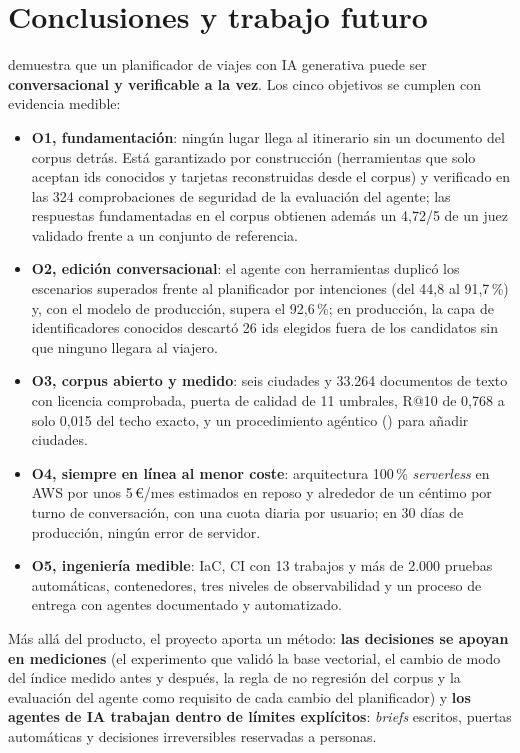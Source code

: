 \section{Conclusiones y trabajo futuro}\label{sec:conclusiones}

\kyrian{} demuestra que un planificador de viajes con IA generativa puede ser
\textbf{conversacional y verificable a la vez}. Los cinco objetivos se cumplen con evidencia
medible:

\begin{itemize}
  \item \textbf{O1, fundamentación}: ningún lugar llega al itinerario sin un documento del corpus
        detrás. Está garantizado por construcción (herramientas que solo aceptan ids conocidos y
        tarjetas reconstruidas desde el corpus) y verificado en las 324 comprobaciones de seguridad
        de la evaluación del agente; las respuestas fundamentadas en el corpus obtienen además un 4,72/5 de un juez validado frente a un conjunto de referencia.
  \item \textbf{O2, edición conversacional}: el agente con herramientas duplicó los escenarios
        superados frente al planificador por intenciones (del 44,8 al 91,7\,\%) y, con el modelo de
        producción, supera el 92,6\,\%; en producción, la capa de identificadores conocidos
        descartó 26 ids elegidos fuera de los candidatos sin que ninguno llegara al viajero.
  \item \textbf{O3, corpus abierto y medido}: seis ciudades y 33.264 documentos de texto con
        licencia comprobada, puerta de calidad de 11 umbrales, R@10 de 0,768 a solo 0,015 del techo exacto,
        y un procedimiento agéntico () para añadir ciudades.
  \item \textbf{O4, siempre en línea al menor coste}: arquitectura 100\,\% \emph{serverless} en
        AWS por unos 5\,€/mes estimados en reposo y alrededor de un céntimo por turno de
        conversación, con una cuota diaria por usuario; en 30 días de producción, ningún error de
        servidor.
  \item \textbf{O5, ingeniería medible}: IaC, CI con 13 trabajos y más de 2.000 pruebas automáticas,
        contenedores, tres niveles de observabilidad y un proceso de entrega con agentes
        documentado y automatizado.
\end{itemize}

Más allá del producto, el proyecto aporta un método: \textbf{las decisiones se apoyan en
mediciones} (el experimento que validó la base vectorial, el cambio de modo del índice medido antes
y después, la regla de no regresión del corpus y la evaluación del agente como requisito de cada
cambio del planificador) y \textbf{los agentes de IA trabajan dentro de límites explícitos}: \emph{briefs} escritos,
puertas automáticas y decisiones irreversibles reservadas a personas.

